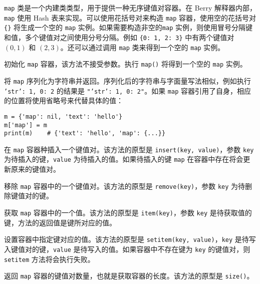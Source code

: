 \texttt{map} 类是一个内建类类型，用于提供一种无序键值对容器。在 Berry 解释器内部，\texttt{map} 使用 Hash 表来实现。可以使用花括号对来构造 \texttt{map} 容器，使用空的花括号对 \texttt{\{\}} 将生成一个空的 \texttt{map} 实例。如果需要构造非空的\texttt{map} 实例，则使用冒号分隔键和值，多个键值对之间使用分号分隔。例如 \texttt{\{0: 1, 2: 3\}} 中有两个键值对 $(0, 1)$ 和 $(2, 3)$。还可以通过调用 \texttt{map} 类来得到一个空的 \texttt{map} 实例。


初始化 \texttt{map} 容器，该方法不接受参数。执行 \texttt{map()} 将得到一个空的 \texttt{map} 实例。


将 \texttt{map} 序列化为字符串并返回。序列化后的字符串与字面量写法相似，例如执行 \texttt{{'str': 1, 0: 2}} 的结果是 \texttt{"{'str': 1, 0: 2}"}。如果 \texttt{map} 容器引用了自身，相应的位置将使用省略号来代替具体的值：
\begin{lstlisting}[language=berry, numbers=none]
m = {'map': nil, 'text': 'hello'}
m['map'] = m
print(m)    # {'text': 'hello', 'map': {...}}
\end{lstlisting}


在 \texttt{map} 容器种插入一个键值对。该方法的原型是 \texttt{insert(key, value)}，参数 \texttt{key} 为待插入的键，\texttt{value} 为待插入的值。如果待插入的键 \texttt{map} 在容器中存在将会更新原来的键值对。


移除 \texttt{map} 容器中的一个键值对。该方法的原型是 \texttt{remove(key)}，参数 \texttt{key} 为待删除键值对的键。


获取 \texttt{map} 容器中的一个值。该方法的原型是 \texttt{item(key)}，参数 \texttt{key} 是待获取值的键，方法的返回值是键所对应的值。


设置容器中指定键对应的值。该方法的原型是 \texttt{setitem(key, value)}，\texttt{key} 是待写入键值对的键，\texttt{value} 是待写入的值。如果容器中不存在键为 \texttt{key} 的键值对，则 \texttt{setitem} 方法将会执行失败。


返回 \texttt{map} 容器的键值对数量，也就是获取容器的长度。该方法的原型是 \texttt{size()}。

